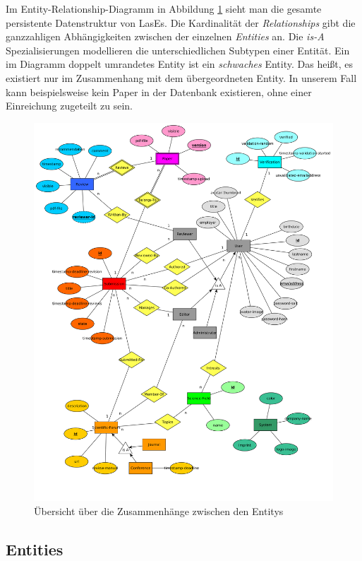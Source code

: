 
Im Entity-Relationship-Diagramm in Abbildung \ref{er:diagramm} sieht man die gesamte persistente Datenstruktur von LasEs. Die Kardinalität der \emph{Relationships} gibt die ganzzahligen Abhängigkeiten zwischen der einzelnen \emph{Entities} an. Die \emph{is-A} Spezialisierungen modellieren die unterschiedlichen Subtypen einer Entität. Ein im Diagramm doppelt umrandetes Entity ist ein \emph{schwaches} Entity. Das heißt, es existiert nur im Zusammenhang mit dem übergeordneten Entity. In unserem Fall kann beispielsweise kein Paper in der Datenbank existieren, ohne einer Einreichung zugeteilt zu sein.

\begin{figure}[H]
	\centering
	\includegraphics[width=\linewidth]{graphics/ER-Modell}
	\caption{Übersicht über die Zusammenhänge zwischen den Entitys}
	\label{er:diagramm}
\end{figure}

\subsection{Entities}

